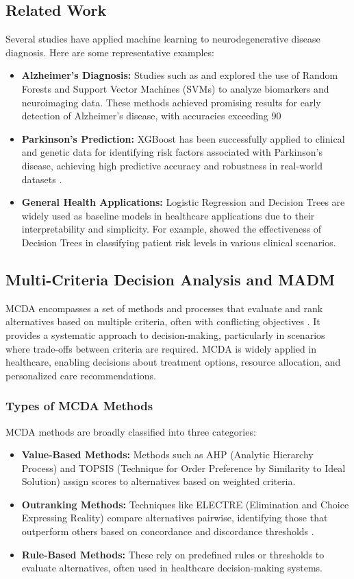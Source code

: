 \documentclass[conference]{IEEEtran}
\begin{document}
\subsection{Related Work}
Several studies have applied machine learning to neurodegenerative disease diagnosis. Here are some representative examples:
\begin{itemize}
    \item \textbf{Alzheimer’s Diagnosis:} Studies such as \cite{b4} and \cite{b5} explored the use of Random Forests and Support Vector Machines (SVMs) to analyze biomarkers and neuroimaging data. These methods achieved promising results for early detection of Alzheimer’s disease, with accuracies exceeding 90%
    \item \textbf{Parkinson’s Prediction:} XGBoost has been successfully applied to clinical and genetic data for identifying risk factors associated with Parkinson’s disease, achieving high predictive accuracy and robustness in real-world datasets \cite{b6}.
    \item \textbf{General Health Applications:} Logistic Regression and Decision Trees are widely used as baseline models in healthcare applications due to their interpretability and simplicity. For example, \cite{b7} showed the effectiveness of Decision Trees in classifying patient risk levels in various clinical scenarios.
\end{itemize}

\subsection{Multi-Criteria Decision Analysis and MADM}
MCDA encompasses a set of methods and processes that evaluate and rank alternatives based on multiple criteria, often with conflicting objectives \cite{b8}. It provides a systematic approach to decision-making, particularly in scenarios where trade-offs between criteria are required. MCDA is widely applied in healthcare, enabling decisions about treatment options, resource allocation, and personalized care recommendations.

\subsubsection{Types of MCDA Methods}
MCDA methods are broadly classified into three categories:
\begin{itemize}
    \item \textbf{Value-Based Methods:} Methods such as AHP (Analytic Hierarchy Process) and TOPSIS (Technique for Order Preference by Similarity to Ideal Solution) assign scores to alternatives based on weighted criteria.
    \item \textbf{Outranking Methods:} Techniques like ELECTRE (Elimination and Choice Expressing Reality) compare alternatives pairwise, identifying those that outperform others based on concordance and discordance thresholds \cite{b12}.
    \item \textbf{Rule-Based Methods:} These rely on predefined rules or thresholds to evaluate alternatives, often used in healthcare decision-making systems.
\end{itemize}
\end{document}
